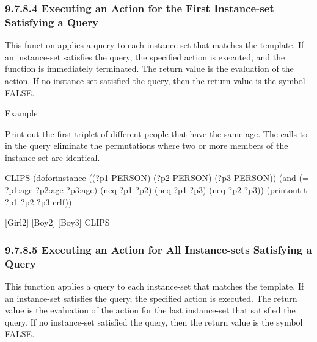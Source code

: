 \documentclass[letterpaper,10pt,english]{sphinxmanual}
\begin{document}
\subsubsection{9.7.8.4 Executing an Action for the First Instance-set Satisfying a Query}
\label{\detokenize{cool:executing-an-action-for-the-first-instance-set-satisfying-a-query}}
This function applies a query to each instance-set that matches the
template. If an instance-set satisfies the query, the specified action
is executed, and the function is immediately terminated. The return
value is the evaluation of the action. If no instance-set satisfied the
query, then the return value is the symbol FALSE.


\begin{sphinxVerbatim}[commandchars=\\\{\}]
   
\end{sphinxVerbatim}

Example

Print out the first triplet of different people that have the same age.
The calls to  in the query eliminate the permutations where two
or more members of the instance-set are identical.

\begin{sphinxVerbatim}[commandchars=\\\{\}]
CLIPS\PYGZgt{}
(do\PYGZhy{}for\PYGZhy{}instance ((?p1 PERSON) (?p2 PERSON) (?p3 PERSON))
  (and (= ?p1:age ?p2:age ?p3:age)
  (neq ?p1 ?p2)
  (neq ?p1 ?p3)
  (neq ?p2 ?p3))
  (printout t ?p1 \PYGZdq{} \PYGZdq{} ?p2 \PYGZdq{} \PYGZdq{} ?p3 crlf))

  [Girl\PYGZhy{}2] [Boy\PYGZhy{}2] [Boy\PYGZhy{}3]
  CLIPS\PYGZgt{}
\end{sphinxVerbatim}


\subsubsection{9.7.8.5 Executing an Action for All Instance-sets Satisfying a Query}
\label{\detokenize{cool:executing-an-action-for-all-instance-sets-satisfying-a-query}}
This function applies a query to each instance-set that matches the
template. If an instance-set satisfies the query, the specified action
is executed. The return value is the evaluation of the action for the
last instance-set that satisfied the query. If no instance-set satisfied
the query, then the return value is the symbol FALSE.
\end{document}
